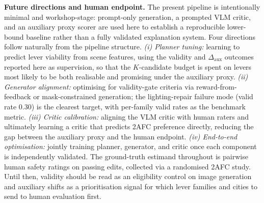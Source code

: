 \noindent\textbf{Future directions and human endpoint.}
The present pipeline is intentionally minimal and workshop-stage: prompt-only generation, a prompted VLM critic, and an auxiliary proxy scorer are used here to establish a reproducible lower-bound baseline rather than a fully validated explanation system. Four directions follow naturally from the
pipeline structure. \emph{(i) Planner tuning:} learning to predict lever
viability from scene features, using the validity and
$\Delta_{\mathrm{aux}}$ outcomes reported here as supervision, so that
the $K$-candidate budget is spent on levers most likely to be both
realisable and promising under the auxiliary proxy. \emph{(ii) Generator alignment:} optimising
for validity-gate criteria via reward-from-feedback or mask-constrained
generation; the lighting-repair failure mode (valid rate 0.30) is the
clearest target, with per-family valid rates as the benchmark metric.
\emph{(iii) Critic calibration:} aligning the VLM critic with human
raters and ultimately learning a critic that predicts 2AFC preference
directly, reducing the gap between the auxiliary proxy and the human
endpoint. \emph{(iv) End-to-end optimisation:} jointly training planner,
generator, and critic once each component is independently validated.
The ground-truth estimand throughout is pairwise human safety ratings on passing edits, collected via a randomised 2AFC study. Until then,
validity should be read as an eligibility control on image generation
and auxiliary shifts as a prioritisation signal for which lever
families and cities to send to human evaluation first.
